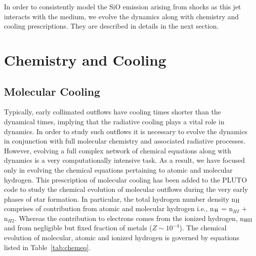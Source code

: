 \documentclass[useAMS,usenatbib]{mn2e}
\begin{document}
%
 
In order to consistently model the SiO emission arising from shocks as
this jet interacts with the medium, we evolve the dynamics along with
chemistry and cooling prescriptions. They are described in details in
the next section.




\section{Chemistry and Cooling}
\label{sec:chem}
\subsection{Molecular Cooling}
\label{ssec:molcool}
Typically, early collimated outflows have cooling times shorter than
the dynamical times, implying that the radiative cooling plays a vital
role in dynamics. In order to study such outflows it is necessary to evolve
the dynamics in conjunction with full molecular chemistry and
associated radiative processes. However, evolving a full complex
network of chemical equations along with dynamics is a very
computationally intensive task. As a result, we have focused only in
evolving the chemical equations pertaining to atomic and molecular
hydrogen. This prescription of molecular cooling has been added to the PLUTO
code to study the chemical evolution of molecular outflows during the
very early phases of star formation. In particular, the total hydrogen
number density n$_{\rm H}$ comprises of contribution from atomic and
molecular hydrogen i.e., n$_{\rm H}$ = n$_{HI}$ + n$_{H2}$. Whereas
the contribution to electrons comes from the ionized hydrogen, n$_{\rm HII}$ and
from negligible but fixed fraction of metals ($Z \sim 10^{-4}$).
The chemical evolution of molecular, atomic and ionized hydrogen is governed by
equations listed in Table~\ref{tab:chemeq}. 
%
\end{document}

